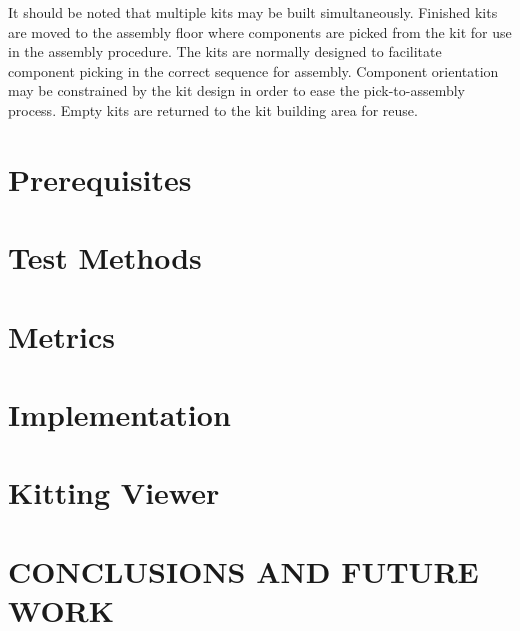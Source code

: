 It should be noted that multiple kits may be built simultaneously.
Finished kits are moved to the assembly floor where components
are picked from the kit for use in the assembly procedure.
The kits are normally designed to facilitate component picking in the correct
sequence for assembly. Component orientation may be constrained
by the kit design in order to ease the pick-to-assembly process.
Empty kits are returned to the kit building area for reuse.

\renewcommand{\topfraction}{1.0}
\setcounter{topnumber}{100}

\section{Prerequisites}
\label{sect:Prerequisites}


\section{Test Methods}
\label{sect:TestMethods}


\section{Metrics}
\label{sect:Metrics}


\section{Implementation}
\label{sect:Implementation}


\section{Kitting Viewer}
\label{sect:KittingViewer}



\addtolength{\textheight}{-15cm}


\section{CONCLUSIONS AND FUTURE WORK}
\label{sect:Conclusions}






